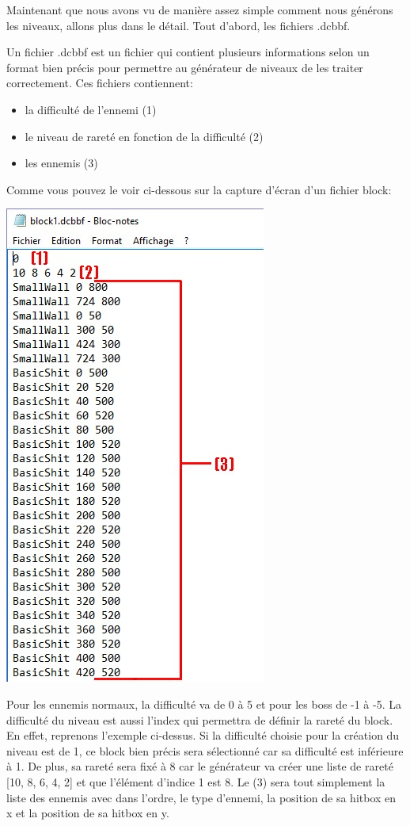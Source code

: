 \documentclass{article}
\begin{document}
Maintenant que nous avons vu de manière assez simple comment nous générons les
niveaux, allons plus dans le détail. Tout d'abord, les fichiers .dcbbf.

Un fichier .dcbbf est un fichier qui contient plusieurs informations selon un
format bien précis pour permettre au générateur de niveaux de les traiter
correctement. Ces fichiers contiennent:

\begin{itemize}
	\item la difficulté de l'ennemi (1)
	\item le niveau de rareté en fonction de la difficulté (2)
	\item les ennemis (3)
\end{itemize}

Comme vous pouvez le voir ci-dessous sur la capture d'écran d'un fichier block:

\begin{center}
\includegraphics[scale=0.75]{fichiers_rapport/images/explaindcbbf.jpg}
\end{center}

Pour les ennemis normaux, la difficulté va de 0 à 5 et pour les boss de -1 à -5.
La difficulté du niveau est aussi l'index qui permettra de définir la rareté du
block. En effet, reprenons l'exemple ci-dessus. Si la difficulté choisie pour la
création du niveau est de 1, ce block bien précis sera sélectionné car sa
difficulté est inférieure à 1. De plus, sa rareté sera fixé à 8 car le
générateur va créer une liste de rareté [10, 8, 6, 4, 2] et que l'élément
d'indice 1 est 8. Le (3) sera tout simplement la liste des ennemis avec dans
l'ordre, le type d'ennemi, la position de sa hitbox en x et la position de sa
hitbox en y.
\end{document}
